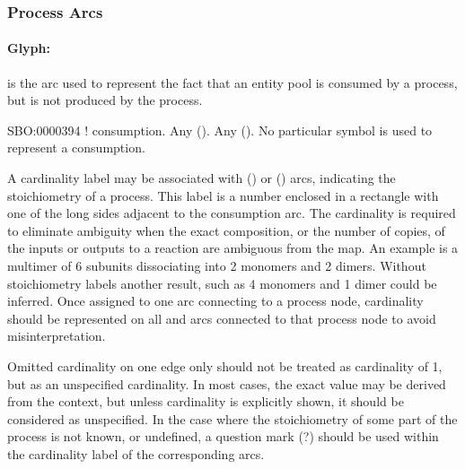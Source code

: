 \subsubsection{Process Arcs}


\paragraph{Glyph: }
\label{sec:consumption}

 is the arc used to represent the fact that an entity pool is consumed by a process,
but is not produced by the process.

\begin{glyphDescription}
 \glyphSboTerm SBO:0000394 ! consumption.
 \glyphOrigin Any  ().
 \glyphTarget Any  ().
 \glyphEndPoint No particular symbol is used to represent a consumption.
\end{glyphDescription}


A cardinality label may be associated with  () or 
 () arcs, indicating the stoichiometry of a process. This label is a number enclosed in a rectangle with one of the long sides adjacent to the consumption arc. The cardinality is 
required to eliminate ambiguity when the exact composition, or the number of 
copies, of the inputs or outputs to a reaction are ambiguous from the map. 
An example is a multimer of 6 subunits dissociating into 2 monomers and 2 
dimers. Without stoichiometry labels another result, such as 4 monomers and 1 
dimer could be inferred.
Once assigned to one arc connecting to a process node, cardinality should be represented on
all  and  arcs connected to that process
node to avoid misinterpretation.

Omitted cardinality on one edge only should not be treated as cardinality of 1, but
as an unspecified cardinality. In most cases, the exact value may be derived from the
context, but unless cardinality is explicitly shown, it should be considered as
unspecified. In the case where the stoichiometry of some part of the process is not
known, or undefined, a question mark (?) should be used within the cardinality label
of the corresponding arcs.

